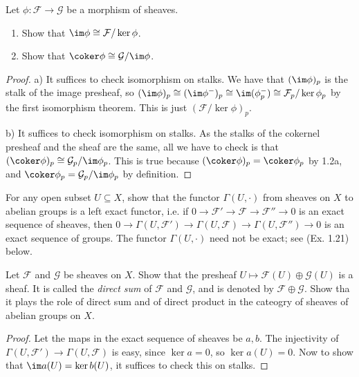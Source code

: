 \begin{exercise}%
	Let $\phi :\mathcal{F}\to \mathcal{G} $ be a morphism of sheaves.
	\begin{enumerate}
		\item Show that $\im \phi \cong \mathcal{F} / \ker \phi $.
		\item Show that $\coker \phi \cong \mathcal{G} / \im \phi $.
	\end{enumerate}
\end{exercise}
\begin{proof}
	a) It suffices to check isomorphism on stalks.
	We have that $(\im \phi)_p $ is the stalk of the image presheaf, so $(\im \phi)_p \cong (\im \phi^-)_p \cong \im (\phi^-_p) \cong \mathcal{F}_p / \ker \phi_p$ by the first isomorphism theorem.
	This is just $(\mathcal{F} / \ker \phi)_p$.

	b) It suffices to check isomorphism on stalks.
	As the stalks of the cokernel presheaf and the sheaf are the same, all we have to check is that $(\coker \phi)_p \cong \mathcal{G}_p / \im \phi_p $.
	This is true because $(\coker \phi)_p = \coker \phi_p$ by 1.2a, and $\coker \phi_p = \mathcal{G}_p / \im \phi_p $ by definition.
\end{proof}

\begin{exercise}%
	For any open subset $U \subseteq X $, show that the functor $\Gamma(U,\cdot) $ from sheaves on $X $ to abelian groups is a left exact functor, i.e. if $0 \to \mathcal{F}' \to \mathcal{F} \to \mathcal{F}'' \to 0 $ is an exact sequence of sheaves, then $0 \to \Gamma(U,\mathcal{F}') \to \Gamma(U,\mathcal{F}) \to \Gamma(U,\mathcal{F}'') \to 0 $ is an exact sequence of groups. The functor $\Gamma(U,\cdot) $ need not be exact; see (Ex. 1.21) below.
\end{exercise}

\begin{exercise}%
	[Direct Sum]
	Let $\mathcal{F} $ and $\mathcal{G} $ be sheaves on $X $. Show that the presheaf $U\mapsto \mathcal{F}(U) \oplus \mathcal{G}(U) $ is a sheaf. It is called the \textit{direct sum} of $\mathcal{F} $ and $\mathcal{G} $, and is denoted by $\mathcal{F}\oplus \mathcal{G} $. Show tha it plays the role of direct sum and of direct product in the cateogry of sheaves of abelian groups on $X $.
\end{exercise}
\begin{proof}
	Let the maps in the exact sequence of sheaves be $a,b $.
	The injectivity of $\Gamma(U,\mathcal{F}') \to \Gamma(U,\mathcal{F}) $ is easy, since $\ker a = 0$, so $\ker a(U) = 0 $.
	Now to show that $\im a(U) = \ker b(U) $, it suffices to check this on stalks.
\end{proof}

